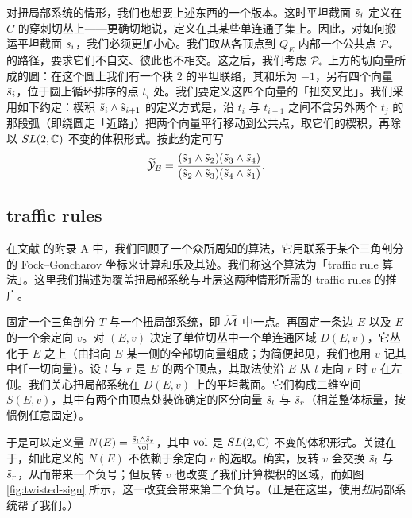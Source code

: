 对扭局部系统的情形，我们也想要上述东西的一个版本。这时平坦截面 $\tilde{s}_i$ 定义在 $C$ 的穿刺切丛上——更确切地说，定义在其某些单连通子集上。因此，对如何搬运平坦截面 $\tilde{s}_i$，我们必须更加小心。我们取从各顶点到 $Q_E$ 内部一个公共点 $\mathcal{P}_*$ 的路径，要求它们不自交、彼此也不相交。这之后，我们考虑 $\mathcal{P}_*$ 上方的切向量所成的圆：在这个圆上我们有一个秩 $2$ 的平坦联络，其和乐为 $-1$，另有四个向量 $\tilde{s}_i$，位于圆上循环排序的点 $t_i$ 处。我们要定义这四个向量的「扭交叉比」。我们采用如下约定：楔积 $\tilde{s}_i \wedge \tilde{s}_{i+1}$ 的定义方式是，沿 $t_i$ 与 $t_{i+1}$ 之间不含另外两个 $t_j$ 的那段弧（即绕圆走「近路」）把两个向量平行移动到公共点，取它们的楔积，再除以 $SL(2,\mathbb{C})$ 不变的体积形式。按此约定可写
\begin{equation} \label{eq:def-tY}
\widetilde{\cal Y}_E = \frac{(\tilde{s}_1 \wedge \tilde{s}_2) (\tilde{s}_3 \wedge \tilde{s}_4)}{(\tilde{s}_2 \wedge \tilde{s}_3)(\tilde{s}_4 \wedge \tilde{s}_1)}.
\end{equation}


\subsection{traffic rules}\label{app:traffic}

在文献 \cite{Gaiotto:2009hg} 的附录 A 中，我们回顾了一个众所周知的算法，它用联系于某个三角剖分的 Fock--Goncharov 坐标来计算和乐及其迹。我们称这个算法为「traffic rule 算法」。这里我们描述为覆盖扭局部系统与叶层这两种情形所需的 traffic rules 的推广。

固定一个三角剖分 $T$ 与一个扭局部系统，即 $\widetilde{\cal M}$ 中一点。再固定一条边 $E$ 以及 $E$ 的一个余定向 $v$。对 $(E,v)$ 决定了单位切丛中一个单连通区域 $D(E,v)$，它丛化于 $E$ 之上（由指向 $E$ 某一侧的全部切向量组成；为简便起见，我们也用 $v$ 记其中任一切向量）。设 $l$ 与 $r$ 是 $E$ 的两个顶点，其取法使沿 $E$ 从 $l$ 走向 $r$ 时 $v$ 在左侧。我们关心扭局部系统在 $D(E,v)$ 上的平坦截面。它们构成二维空间 $S(E,v)$，其中有两个由顶点处装饰确定的区分向量 $\tilde{s}_l$ 与 $\tilde{s}_r$（相差整体标量，按惯例任意固定）。

于是可以定义量 $N(E) = \frac{\tilde{s}_l \wedge \tilde{s}_r}{\operatorname{vol}}$，其中 $\operatorname{vol}$ 是 $SL(2,\mathbb{C})$ 不变的体积形式。关键在于，如此定义的 $N(E)$ 不依赖于余定向 $v$ 的选取。确实，反转 $v$ 会交换 $\tilde{s}_l$ 与 $\tilde{s}_r$，从而带来一个负号；但反转 $v$ 也改变了我们计算楔积的区域，而如图 \ref{fig:twisted-sign} 所示，这一改变会带来第二个负号。（正是在这里，使用\emph{扭}局部系统帮了我们。）



